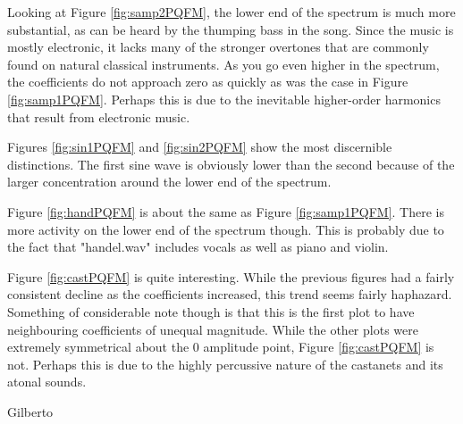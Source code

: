 \documentclass{article} %
\begin{document}
Looking at Figure \ref{fig:samp2PQFM}, the lower end of the spectrum is much
more substantial, as can be heard by the thumping bass in the song. Since the
music is mostly electronic, it lacks many of the stronger overtones that are
commonly found on natural classical instruments. As you go even higher in the
spectrum, the coefficients do not approach zero as quickly as was the case
in Figure \ref{fig:samp1PQFM}. Perhaps this is due to the inevitable 
higher-order harmonics that result from electronic music. 

Figures \ref{fig:sin1PQFM} and \ref{fig:sin2PQFM} show the most discernible
distinctions. The first sine wave is obviously lower than the second because
of the larger concentration around the lower end of the spectrum. 

Figure \ref{fig:handPQFM} is about the same as Figure \ref{fig:samp1PQFM}. There
is more activity on the lower end of the spectrum though. This is probably due
to the fact that "handel.wav" includes vocals as well as piano and violin. 


Figure \ref{fig:castPQFM} is quite interesting. While the previous figures had
a fairly consistent decline as the coefficients increased, this trend
seems fairly haphazard. Something of considerable note though is that
this is the first plot to have neighbouring coefficients of unequal magnitude.
While the other plots were extremely symmetrical about the 0 amplitude point, 
Figure \ref{fig:castPQFM} is not. Perhaps this is due to the highly percussive
nature of the castanets and its atonal sounds. 

Gilberto
















% 





\end{document}
